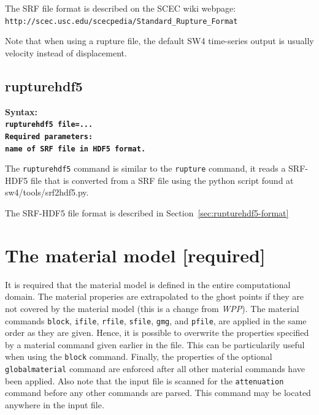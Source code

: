 \documentclass[11pt]{report}
\begin{document}
{The SRF file format is described on the SCEC wiki webpage:
\verb+http://scec.usc.edu/scecpedia/Standard_Rupture_Format+

Note that when using a rupture file, the default SW4 time-series output is usually velocity instead of displacement.



\subsection{rupturehdf5}
\label{keyword:rupturehdf5}
\begin{flushleft}
	\bf
	Syntax:\\ \tt rupturehdf5 file=...\\
	\bf
	Required parameters:\\ \rm name of SRF file in HDF5 format.
\end{flushleft}
The \verb+rupturehdf5+ command is similar to the \verb+rupture+ command, it reads a SRF-HDF5 file that is
converted from a SRF file using the python script found at sw4/tools/srf2hdf5.py.

The SRF-HDF5 file format is described in Section~\ref{sec:rupturehdf5-format}


\section{The material model [required]}

It is required that the material model is defined in the entire computational domain. The material
properies are extrapolated to the ghost points if they are not covered by the material model (this
is a change from \emph{WPP}). The material commands \verb+block+, \verb+ifile+, \verb+rfile+, \verb+sfile+, \verb+gmg+, and
\verb+pfile+, are applied in the same order as they are given. Hence, it is possible to overwrite
the properties specified by a material command given earlier in the file. This can be particularily
useful when using the \verb+block+ command. Finally, the properties of the optional
\verb+globalmaterial+ command are enforced after all other material commands have been applied. Also
note that the input file is scanned for the \verb+attenuation+ command before any other commands are
parsed. This command may be located anywhere in the input file.

}
\end{document}
